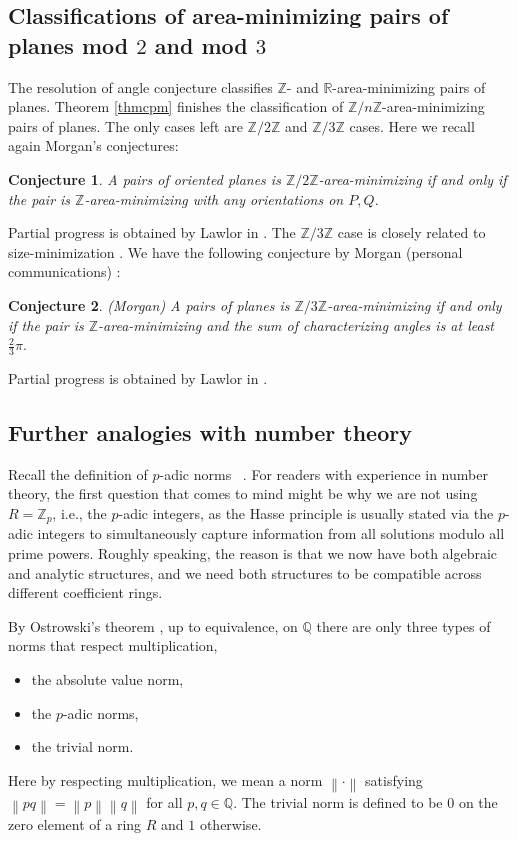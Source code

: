 \documentclass[11pt,a4paper]{amsart}
\numberwithin{equation}{section}
\newcommand{\no}[1]{\left\lVert#1\right\rVert}
\newcommand{\R}{\mathbb{R}}
\newcommand{\Z}{\mathbb{Z}}
\newcommand{\Q}{\mathbb{Q}}
\theoremstyle{plain}
\newtheorem{conj}{Conjecture}
\theoremstyle{definition}
\numberwithin{equation}{subsection}
\begin{document}
\subsection{Classifications of area-minimizing pairs of planes mod $2$ and mod $3$}\label{secremp}
The resolution of angle conjecture \cite{DN,GLac} classifies  $\Z$- and $\R$-area-minimizing pairs of planes. Theorem \ref{thmcpm} finishes the classification of $\Z/n\Z$-area-minimizing pairs of planes. The only cases left are $\Z/2\Z$ and $\Z/3\Z$ cases. Here we recall again Morgan's conjectures:
\begin{conj}\cite[Problem 16]{FMwtc}A pairs of oriented planes is $\Z/2\Z$-area-minimizing if and only if the pair is $\Z$-area-minimizing with any orientations on $P,Q$. 
\end{conj}
Partial progress is obtained by Lawlor in \cite{GLds,GL,GLmk}. The $\Z/3\Z$ case is closely related to size-minimization \cite{FMsm}. We have the following conjecture by Morgan (personal communications) :
\begin{conj}(Morgan)
A pairs of planes is $\Z/3\Z$-area-minimizing if and only if the pair is $\Z$-area-minimizing and the sum of characterizing angles is at least $\frac{2}{3}\pi.$
\end{conj}
Partial progress is obtained by Lawlor in \cite{GLpp,GL}.
\subsection{Further analogies with number theory}
\label{secdot}
Recall the definition of $p$-adic norms  \cite[Chapter I]{NKpa}. For readers with experience in number theory, the first question that comes to mind might be why we are not using $R=\Z_p$, i.e., the $p$-adic integers, as the Hasse principle is usually stated via the $p$-adic integers to simultaneously capture information from all solutions modulo all prime powers. Roughly speaking, the reason is that we now have both algebraic and analytic structures, and we need both structures to be compatible across different coefficient rings. 

By Ostrowski's theorem \cite[Chapter I]{NKpa}, up to equivalence, on $\Q$ there are only three types of norms that respect multiplication,
\begin{itemize}
	\item the absolute value norm,
	\item the $p$-adic norms,
	\item the trivial norm.
\end{itemize}	
Here by respecting multiplication, we mean a norm $\no{\cdot}$ satisfying $\no{pq}=\no{p}\no{q}$ for all $p,q\in\Q$. The trivial norm is defined to be $0$ on the zero element of a ring $R$ and $1$ otherwise. 
\end{document}
